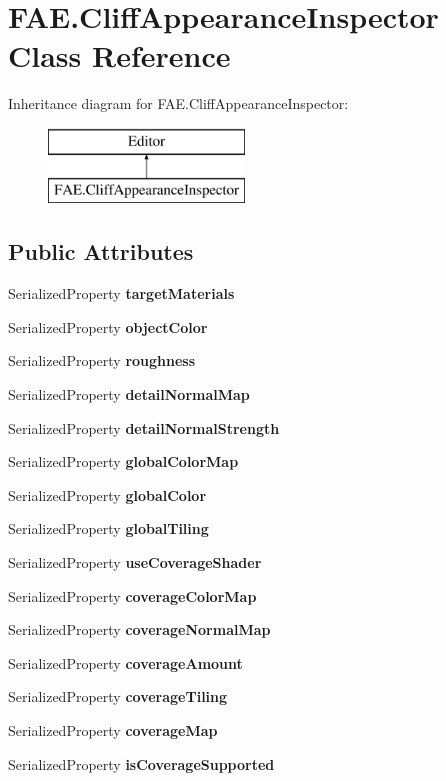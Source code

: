\section{F\+A\+E.\+Cliff\+Appearance\+Inspector Class Reference}
\label{class_f_a_e_1_1_cliff_appearance_inspector}
Inheritance diagram for F\+A\+E.\+Cliff\+Appearance\+Inspector\+:\begin{figure}[H]
\begin{center}
\leavevmode
\includegraphics[height=2.000000cm]{class_f_a_e_1_1_cliff_appearance_inspector}
\end{center}
\end{figure}
\subsection*{Public Attributes}
\begin{DoxyCompactItemize}
\item 
Serialized\+Property \textbf{ target\+Materials}
\item 
Serialized\+Property \textbf{ object\+Color}
\item 
Serialized\+Property \textbf{ roughness}
\item 
Serialized\+Property \textbf{ detail\+Normal\+Map}
\item 
Serialized\+Property \textbf{ detail\+Normal\+Strength}
\item 
Serialized\+Property \textbf{ global\+Color\+Map}
\item 
Serialized\+Property \textbf{ global\+Color}
\item 
Serialized\+Property \textbf{ global\+Tiling}
\item 
Serialized\+Property \textbf{ use\+Coverage\+Shader}
\item 
Serialized\+Property \textbf{ coverage\+Color\+Map}
\item 
Serialized\+Property \textbf{ coverage\+Normal\+Map}
\item 
Serialized\+Property \textbf{ coverage\+Amount}
\item 
Serialized\+Property \textbf{ coverage\+Tiling}
\item 
Serialized\+Property \textbf{ coverage\+Map}
\item 
Serialized\+Property \textbf{ is\+Coverage\+Supported}
\end{DoxyCompactItemize}


